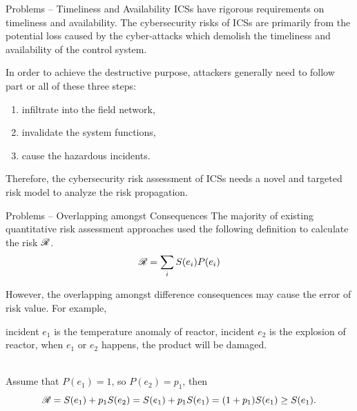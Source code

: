 \begin{frame}{Problems -- Timeliness and Availability}\label{Introduction: Problem of Timeliness and Availability}
    ICSs have rigorous requirements on timeliness and availability. The cybersecurity risks of ICSs are primarily from the potential loss caused by the cyber-attacks which demolish the timeliness and availability of the control system.
    
    \pause
    In order to achieve the destructive purpose, attackers generally need to follow part or all of these three steps:
    \begin{enumerate}
      \item infiltrate into the field network,
      \item invalidate the system functions,
      \item cause the hazardous incidents.
    \end{enumerate}

    \pause
    Therefore, the cybersecurity risk assessment of ICSs needs  a novel and targeted risk model to analyze the risk propagation.
\end{frame}

\begin{frame}{Problems -- Overlapping amongst Consequences}\label{Introduction: Problem of Overlapping amongst Consequences}
    The majority of existing quantitative risk assessment approaches used the following definition to calculate the risk $\mathscr{R}$.
    \[
        \mathscr{R} = \sum_i S(e_i)P(e_i)
    \]
    
    \pause
    However, the overlapping amongst difference consequences may cause the error of risk value. \pause For example,
    \vspace{10pt}\\
    \begin{minipage}[l]{0.2\textwidth}
      
    \end{minipage}
    \begin{minipage}[l]{0.8\textwidth}
        incident $e_1$ is the temperature anomaly of reactor, incident $e_2$ is the explosion of reactor, when $e_1$ or $e_2$ happens, the product will be damaged.
    \end{minipage}
    \vspace{10pt}\\\pause
    Assume that $P(e_1) = 1$, so $P(e_2) = p_1$, then
    \[
        \mathscr{R} = S(e_1) + p_1S(e_2) = S(e_1) + p_1S(e_1) = (1+p_1)S(e_1) \geq S(e_1)\text{.}
    \]
\end{frame}

